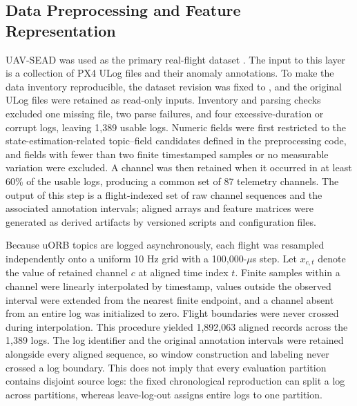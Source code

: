 \subsection{Data Preprocessing and Feature Representation}
\label{sec:data_preprocessing}

UAV-SEAD was used as the primary real-flight dataset \cite{kabaoglu2026uavsead}. The input to this layer is a collection of PX4 ULog files and their anomaly annotations. To make the data inventory reproducible, the dataset revision was fixed to \texttt{}, and the original ULog files were retained as read-only inputs. Inventory and parsing checks excluded one missing file, two parse failures, and four excessive-duration or corrupt logs, leaving 1,389 usable logs. Numeric fields were first restricted to the state-estimation-related topic--field candidates defined in the preprocessing code, and fields with fewer than two finite timestamped samples or no measurable variation were excluded. A channel was then retained when it occurred in at least 60\% of the usable logs, producing a common set of 87 telemetry channels. The output of this step is a flight-indexed set of raw channel sequences and the associated annotation intervals; aligned arrays and feature matrices were generated as derived artifacts by versioned scripts and configuration files.

Because uORB topics are logged asynchronously, each flight was resampled independently onto a uniform 10 Hz grid with a 100,000-$\mu$s step. Let $x_{c,t}$ denote the value of retained channel $c$ at aligned time index $t$. Finite samples within a channel were linearly interpolated by timestamp, values outside the observed interval were extended from the nearest finite endpoint, and a channel absent from an entire log was initialized to zero. Flight boundaries were never crossed during interpolation. This procedure yielded 1,892,063 aligned records across the 1,389 logs. The log identifier and the original annotation intervals were retained alongside every aligned sequence, so window construction and labeling never crossed a log boundary. This does not imply that every evaluation partition contains disjoint source logs: the fixed chronological reproduction can split a log across partitions, whereas leave-log-out assigns entire logs to one partition.

